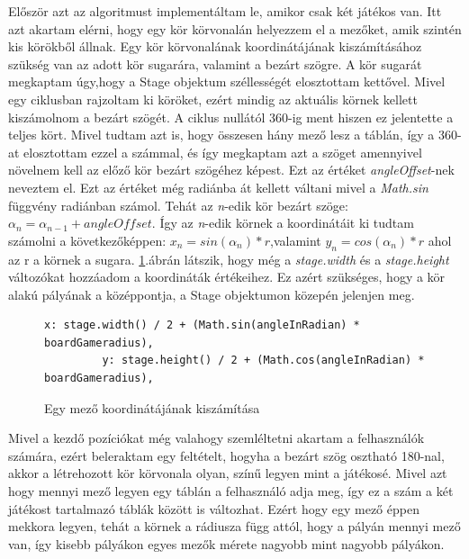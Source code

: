 \documentclass[a4paper,twoside]{article}
\begin{document}
Először azt az algoritmust implementáltam le, amikor csak két játékos van. Itt azt akartam elérni, hogy egy kör körvonalán helyezzem el a mezőket, amik szintén kis körökből állnak. Egy kör körvonalának koordinátájának kiszámításához szükség van az adott kör sugarára, valamint a bezárt szögre. A kör sugarát megkaptam úgy,hogy a Stage objektum széllességét elosztottam kettővel. Mivel egy ciklusban rajzoltam ki köröket, ezért mindig az aktuális körnek kellett kiszámolnom  a bezárt szögét. A ciklus nullától 360-ig ment hiszen ez jelentette a teljes kört. Mivel tudtam azt is, hogy összesen hány mező lesz a táblán, így a 360-at elosztottam ezzel a számmal, és így megkaptam azt a szöget amennyivel növelnem kell az előző kör bezárt szögéhez képest. Ezt az értéket \textit{angleOffset}-nek neveztem el. Ezt az értéket még radiánba át kellett váltani mivel a \textit{Math.sin} függvény radiánban számol.  Tehát az \textit{n}-edik kör bezárt szöge: \(\alpha_{n} = \alpha_{n-1} + angleOffset\). Így az \textit{n}-edik körnek a koordinátáit ki tudtam számolni a következőképpen: 
\(x_{n} = sin(\alpha_{n})*r\),valamint \(y_{n} = cos(\alpha_{n})*r\) ahol az r a körnek a sugara. \ref{kettesPlayerKoord}.ábrán látszik, hogy még a \textit{stage.width} és a \textit{stage.height} változókat hozzáadom a koordináták értékeihez. Ez azért szükséges, hogy a kör alakú pályának a középpontja, a Stage objektumon közepén jelenjen meg. 

\begin{figure}
	\caption{Egy mező koordinátájának kiszámítása}
	\begin{minipage}{\textwidth}
		\begin{lstlisting}[style=javascriptStyle]
		 x: stage.width() / 2 + (Math.sin(angleInRadian) * boardGameradius),
	   	 y: stage.height() / 2 + (Math.cos(angleInRadian) * boardGameradius),
		\end{lstlisting}
	\end{minipage}
	
	\label{kettesPlayerKoord}
\end{figure}

Mivel a kezdő pozíciókat még valahogy szemléltetni akartam a felhasználók számára, ezért beleraktam egy feltételt, hogyha a bezárt szög osztható 180-nal, akkor a létrehozott kör körvonala olyan, színű legyen mint a játékosé. Mivel azt hogy mennyi mező legyen egy táblán a felhasználó adja meg, így ez a szám a két játékost tartalmazó táblák között is változhat. Ezért hogy egy mező éppen mekkora legyen, tehát a körnek a rádiusza függ attól, hogy a pályán mennyi mező van, így kisebb pályákon egyes mezők mérete nagyobb mint nagyobb pályákon.
\end{document}
